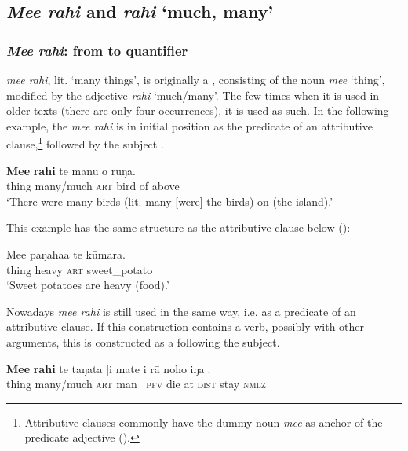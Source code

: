\subsection{\textit{Me{\ꞌ}e rahi} and \textit{rahi} ‘much, many’}\label{sec:4.4.7}
\subsubsection{\textit{Me{\ꞌ}e rahi}: from  to quantifier}\label{sec:4.4.7.1}
\textit{me{\ꞌ}e rahi}, lit. ‘many things’, is originally a , consisting of the noun \textit{me{\ꞌ}e} ‘thing’, modified by the adjective \textit{rahi} ‘much/many’. The few times when it is used in older texts (there are only four occurrences), it is used as such. In the following example, the  \textit{me{\ꞌ}e rahi} is in initial position as the predicate of an attributive clause,\footnote{\label{fn:184}Attributive clauses commonly have the dummy noun \textit{me{\ꞌ}e} as anchor of the predicate adjective ().} followed by the subject .

\ea\label{ex:4.87}
\gll \textbf{Me{\ꞌ}e} \textbf{rahi} te manu o ruŋa. \\
thing many/much \textsc{art} bird of above \\

\glt
‘There were many birds (lit. many [were] the birds) on (the island).’ \textstyleExampleref{[Egt-02.083]}
\z

This example has the same structure as the attributive clause below ():

\ea\label{ex:4.88}
\gll Me{\ꞌ}e paŋaha{\ꞌ}a te kūmara.\\
thing heavy \textsc{art} sweet\_potato\\

\glt 
‘Sweet potatoes are heavy (food).’ \textstyleExampleref{[Ley-5-24.008]}
\z

Nowadays \textit{me{\ꞌ}e rahi} is still used in the same way, i.e. as a predicate of an attributive clause. If this construction contains a verb, possibly with other arguments, this is constructed as a  following the subject.

\ea\label{ex:4.89}
\gll \textbf{Me{\ꞌ}e} \textbf{rahi} te taŋata [i mate {\ꞌ}i rā noho iŋa]. \\
thing many/much \textsc{art} man \textsc{~pfv} die at \textsc{dist} stay \textsc{nmlz} \\

